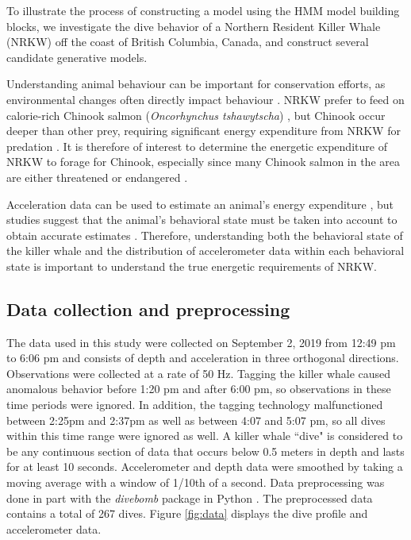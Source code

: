 

To illustrate the process of constructing a model using the HMM model building blocks, we investigate the dive behavior of a Northern Resident Killer Whale (NRKW) off the coast of British Columbia, Canada, and construct several candidate generative models.

Understanding animal behaviour can be important for conservation efforts, as environmental changes often directly impact behaviour \citep{Sutherland:1998}. NRKW prefer to feed on calorie-rich Chinook salmon (\textit{Oncorhynchus
tshawytscha}) \citep{Ford:2006}, but Chinook occur deeper than other prey, requiring significant energy expenditure from NRKW for predation \citep{Williams:2009,Noren:2011}. It is therefore of interest to determine the energetic expenditure of NRKW to forage for Chinook, especially since many Chinook salmon in the area are either threatened or endangered \citep{Ford:2015}.

Acceleration data can be used to estimate an animal's energy expenditure \citep{Green:2009,Wilson:2019}, but studies suggest that the animal's behavioral state must be taken into account to obtain accurate estimates \citep{Dot:2016}. Therefore, understanding both the behavioral state of the killer whale and the distribution of accelerometer data within each behavioral state is important to understand the true energetic requirements of NRKW.

\subsection{Data collection and preprocessing}

The data used in this study were collected on September 2, 2019 from 12:49 pm to 6:06 pm and consists of depth and acceleration in three orthogonal directions. Observations were collected at a rate of 50 Hz. Tagging the killer whale caused anomalous behavior before 1:20 pm and after 6:00 pm, so observations in these time periods were ignored. In addition, the tagging technology malfunctioned between 2:25pm and 2:37pm as well as between 4:07 and 5:07 pm, so all dives within this time range were ignored as well. A killer whale ``dive" is considered to be any continuous section of data that occurs below 0.5 meters in depth and lasts for at least 10 seconds. Accelerometer and depth data were smoothed by taking a moving average with a window of 1/10th of a second. Data preprocessing was done in part with the \textit{divebomb} package in Python \citep{Nunes:2018}. The preprocessed data contains a total of 267 dives. Figure \ref{fig:data} displays the dive profile and accelerometer data.

